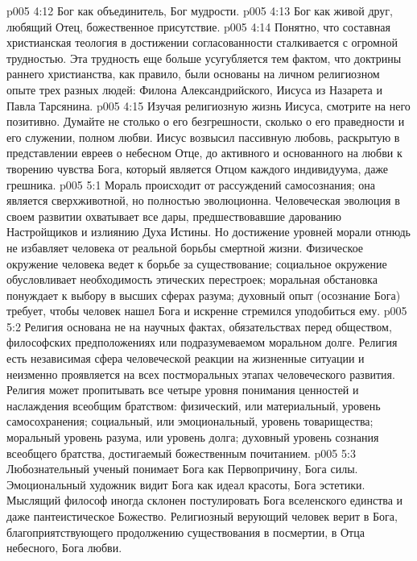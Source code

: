 \vs p005 4:12 \bibnobreakspace {} Бог как объединитель, Бог мудрости.
\vs p005 4:13 \bibnobreakspace {} Бог как живой друг, любящий Отец, божественное присутствие.
\vs p005 4:14 \pc Понятно, что составная христианская теология в достижении согласованности сталкивается с огромной трудностью. Эта трудность еще больше усугубляется тем фактом, что доктрины раннего христианства, как правило, были основаны на личном религиозном опыте трех разных людей: Филона Александрийского, Иисуса из Назарета и Павла Тарсянина.
\vs p005 4:15 \pc Изучая религиозную жизнь Иисуса, смотрите на него позитивно. Думайте не столько о его безгрешности, сколько о его праведности и его служении, полном любви. Иисус возвысил пассивную любовь, раскрытую в представлении евреев о небесном Отце, до  активного и основанного на любви к творению чувства Бога, который является Отцом каждого индивидуума, даже грешника.
\vs p005 5:1 Мораль происходит от рассуждений самосознания; она является сверхживотной, но полностью эволюционна. Человеческая эволюция в своем развитии охватывает все дары, предшествовавшие дарованию Настройщиков и излиянию Духа Истины. Но достижение уровней морали отнюдь не избавляет человека от реальной борьбы смертной жизни. Физическое окружение человека ведет к борьбе за существование; социальное окружение обусловливает необходимость этических перестроек; моральная обстановка понуждает к выбору в высших сферах разума; духовный опыт (осознание Бога) требует, чтобы человек нашел Бога и искренне стремился уподобиться ему.
\vs p005 5:2 Религия основана не на научных фактах, обязательствах перед обществом, философских предположениях или подразумеваемом моральном долге. Религия есть независимая сфера человеческой реакции на жизненные ситуации и неизменно проявляется на всех постморальных этапах человеческого развития. Религия может пропитывать все четыре уровня понимания ценностей и наслаждения всеобщим братством: физический, или материальный, уровень самосохранения; социальный, или эмоциональный, уровень товарищества; моральный уровень разума, или уровень долга; духовный уровень сознания всеобщего братства, достигаемый божественным почитанием.
\vs p005 5:3 Любознательный ученый понимает Бога как Первопричину, Бога силы. Эмоциональный художник видит Бога как идеал красоты, Бога эстетики. Мыслящий философ иногда склонен постулировать Бога вселенского единства и даже пантеистическое Божество. Религиозный верующий человек верит в Бога, благоприятствующего продолжению существования в посмертии, в Отца небесного, Бога любви.
